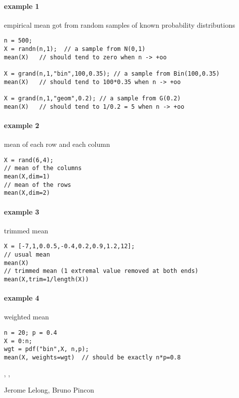 \begin{examples}
\paragraph{example 1} empirical mean got from random samples of known probability distributions 
\begin{Verbatim}
n = 500;
X = randn(n,1);  // a sample from N(0,1)
mean(X)   // should tend to zero when n -> +oo

X = grand(n,1,"bin",100,0.35); // a sample from Bin(100,0.35)
mean(X)   // should tend to 100*0.35 when n -> +oo

X = grand(n,1,"geom",0.2); // a sample from G(0.2)
mean(X)   // should tend to 1/0.2 = 5 when n -> +oo
\end{Verbatim}

\paragraph{example 2} mean of each row and each column
\begin{Verbatim}
X = rand(6,4);
// mean of the columns
mean(X,dim=1)
// mean of the rows
mean(X,dim=2)
\end{Verbatim}

\paragraph{example 3} trimmed mean
\begin{Verbatim}
X = [-7,1,0.0.5,-0.4,0.2,0.9,1.2,12];
// usual mean
mean(X)
// trimmed mean (1 extremal value removed at both ends)
mean(X,trim=1/length(X))
\end{Verbatim}

\paragraph{example 4} weighted mean
\begin{Verbatim}
n = 20; p = 0.4
X = 0:n;
wgt = pdf("bin",X, n,p);
mean(X, weights=wgt)  // should be exactly n*p=0.8
\end{Verbatim}


\end{examples}

\begin{manseealso}
   , , 
\end{manseealso}

\begin{authors}
  Jerome Lelong, Bruno Pincon
\end{authors}
